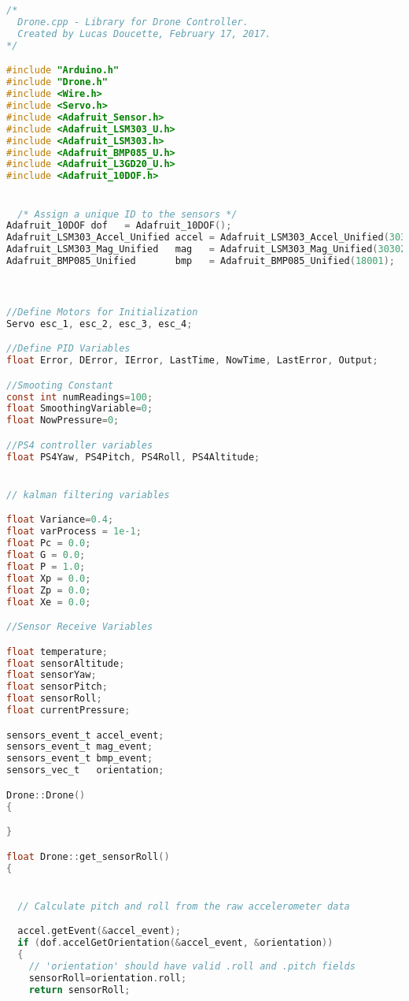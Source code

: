 \begin{lstlisting}[language=C,caption={Drone.cpp Arduino Library File},label={lst:Drone.cpp}]


/*
  Drone.cpp - Library for Drone Controller.
  Created by Lucas Doucette, February 17, 2017.
*/

#include "Arduino.h"
#include "Drone.h"
#include <Wire.h>
#include <Servo.h>
#include <Adafruit_Sensor.h>
#include <Adafruit_LSM303_U.h>
#include <Adafruit_LSM303.h>
#include <Adafruit_BMP085_U.h>
#include <Adafruit_L3GD20_U.h>
#include <Adafruit_10DOF.h>


  /* Assign a unique ID to the sensors */
Adafruit_10DOF dof   = Adafruit_10DOF();
Adafruit_LSM303_Accel_Unified accel = Adafruit_LSM303_Accel_Unified(30301);
Adafruit_LSM303_Mag_Unified   mag   = Adafruit_LSM303_Mag_Unified(30302);
Adafruit_BMP085_Unified       bmp   = Adafruit_BMP085_Unified(18001);



//Define Motors for Initialization
Servo esc_1, esc_2, esc_3, esc_4;

//Define PID Variables
float Error, DError, IError, LastTime, NowTime, LastError, Output;

//Smooting Constant
const int numReadings=100;
float SmoothingVariable=0;
float NowPressure=0;

//PS4 controller variables
float PS4Yaw, PS4Pitch, PS4Roll, PS4Altitude;


// kalman filtering variables

float Variance=0.4;
float varProcess = 1e-1;
float Pc = 0.0;
float G = 0.0;
float P = 1.0;
float Xp = 0.0;
float Zp = 0.0;
float Xe = 0.0;

//Sensor Receive Variables

float temperature;
float sensorAltitude;
float sensorYaw;
float sensorPitch;
float sensorRoll;
float currentPressure;

sensors_event_t accel_event;
sensors_event_t mag_event;
sensors_event_t bmp_event;
sensors_vec_t   orientation;

Drone::Drone()
{

}

float Drone::get_sensorRoll()
{


  // Calculate pitch and roll from the raw accelerometer data

  accel.getEvent(&accel_event);
  if (dof.accelGetOrientation(&accel_event, &orientation))
  {
    // 'orientation' should have valid .roll and .pitch fields
    sensorRoll=orientation.roll;
    return sensorRoll;



\end{lstlisting}
